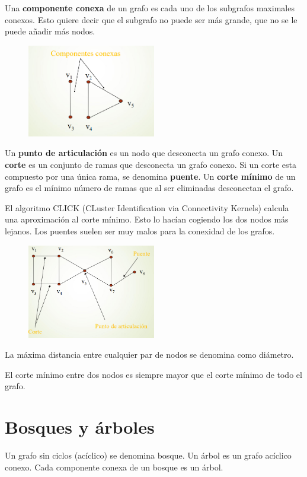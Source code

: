 Una \textbf{componente conexa} de un grafo es cada uno de los subgrafos
maximales conexos. Esto quiere decir que el subgrafo no puede ser más grande, que no se le puede añadir más nodos.

\begin{figure}[h]
\centering
\includegraphics[width = 0.5\textwidth]{figs/componentes-conexas.png}
\end{figure}

Un \textbf{punto de articulación} es un nodo que desconecta un grafo conexo. Un \textbf{corte} es un conjunto de ramas que desconecta un grafo conexo. Si un corte esta compuesto por una única rama, se denomina \textbf{puente}. Un \textbf{corte mínimo} de un grafo es el mínimo número de ramas que al ser eliminadas desconectan el grafo.

El algoritmo CLICK (CLuster Identification via Connectivity Kernels) calcula una aproximación al corte mínimo. Esto lo hacían cogiendo los dos nodos más lejanos. Los puentes suelen ser muy malos para la conexidad de los grafos. 

\begin{figure}[h]
\centering
\includegraphics[width = 0.5\textwidth]{figs/conexidad2.png}
\end{figure}

La máxima distancia entre cualquier par de nodos se denomina como diámetro.

El corte mínimo entre dos nodos es siempre mayor que el corte mínimo de todo el grafo.  

\section{Bosques y árboles}
Un grafo sin ciclos (acíclico) se denomina bosque. Un árbol es un grafo acíclico conexo. Cada componente conexa de un bosque es un árbol.

